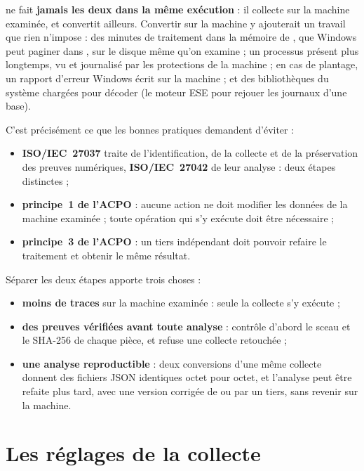 \documentclass[11pt,a4paper,oneside]{report}
\begin{document}
\wac{} ne fait \textbf{jamais les deux dans la même exécution} : il collecte
sur la machine examinée, et convertit ailleurs. Convertir sur la machine y
ajouterait un travail que rien n'impose : des minutes de traitement dans la
mémoire de \wac{}, que Windows peut paginer dans , sur le
disque même qu'on examine ; un processus présent plus longtemps, vu et
journalisé par les protections de la machine ; en cas de plantage, un rapport
d'erreur Windows écrit sur la machine ; et des bibliothèques du système chargées
pour décoder (le moteur ESE pour rejouer les journaux d'une base).

C'est précisément ce que les bonnes pratiques demandent d'éviter :
\begin{itemize}
  \item \textbf{ISO/IEC~27037} traite de l'identification, de la collecte et de
        la préservation des preuves numériques, \textbf{ISO/IEC~27042} de leur
        analyse : deux étapes distinctes ;
  \item \textbf{principe~1 de l'ACPO} : aucune action ne doit modifier les
        données de la machine examinée ; toute opération qui s'y exécute doit
        être nécessaire ;
  \item \textbf{principe~3 de l'ACPO} : un tiers indépendant doit pouvoir
        refaire le traitement et obtenir le même résultat.
\end{itemize}

Séparer les deux étapes apporte trois choses :
\begin{itemize}
  \item \textbf{moins de traces} sur la machine examinée : seule la collecte
        s'y exécute ;
  \item \textbf{des preuves vérifiées avant toute analyse} : 
        contrôle d'abord le sceau et le SHA-256 de chaque pièce, et refuse une
        collecte retouchée ;
  \item \textbf{une analyse reproductible} : deux conversions d'une même
        collecte donnent des fichiers JSON identiques octet pour octet, et
        l'analyse peut être refaite plus tard, avec une version corrigée de
        \wac{} ou par un tiers, sans revenir sur la machine.
\end{itemize}

\section{Les réglages de la collecte}
\end{document}
